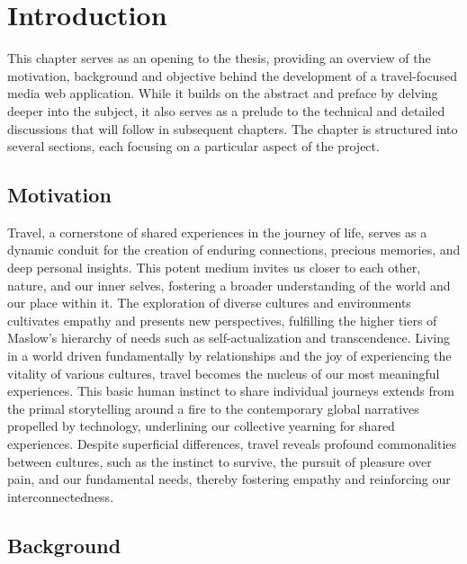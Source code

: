 \chapter{Introduction}

\label{intro}

\par This chapter serves as an opening to the thesis, providing an overview of the motivation, background and objective behind the development of a travel-focused media web application. While it builds on the abstract and preface by delving deeper into the subject, it also serves as a prelude to the technical and detailed discussions that will follow in subsequent chapters. The chapter is structured into several sections, each focusing on a particular aspect of the project.

\section{Motivation}

\par Travel, a cornerstone of shared experiences in the journey of life, serves as a dynamic conduit for the creation of enduring connections, precious memories, and deep personal insights. This potent medium invites us closer to each other, nature, and our inner selves, fostering a broader understanding of the world and our place within it. The exploration of diverse cultures and environments cultivates empathy and presents new perspectives, fulfilling the higher tiers of Maslow's hierarchy of needs such as self-actualization and transcendence. Living in a world driven fundamentally by relationships and the joy of experiencing the vitality of various cultures, travel becomes the nucleus of our most meaningful experiences. This basic human instinct to share individual journeys extends from the primal storytelling around a fire to the contemporary global narratives propelled by technology, underlining our collective yearning for shared experiences. Despite superficial differences, travel reveals profound commonalities between cultures, such as the instinct to survive, the pursuit of pleasure over pain, and our fundamental needs, thereby fostering empathy and reinforcing our interconnectedness.



\section{Background}

